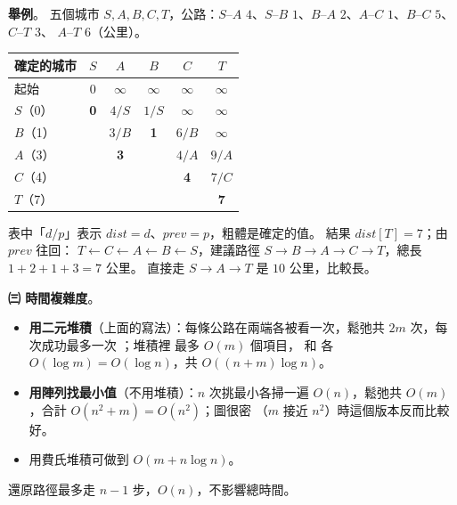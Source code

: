 \begin{pastsoln}
\textbf{舉例}。 五個城市 $S, A, B, C, T$，公路：$S$–$A$ $4$、$S$–$B$ $1$、$B$–$A$ $2$、$A$–$C$ $1$、$B$–$C$ $5$、$C$–$T$ $3$、
$A$–$T$ $6$（公里）。
\begin{center}
\end{center}
\begin{center}
\small
\begin{tabular}{lccccc}
\toprule
確定的城市 & $S$ & $A$ & $B$ & $C$ & $T$ \\
\midrule
起始 & $0$ & $\infty$ & $\infty$ & $\infty$ & $\infty$ \\
$S$（0） & \textbf{0} & $4/S$ & $1/S$ & $\infty$ & $\infty$ \\
$B$（1） & & $3/B$ & \textbf{1} & $6/B$ & $\infty$ \\
$A$（3） & & \textbf{3} & & $4/A$ & $9/A$ \\
$C$（4） & & & & \textbf{4} & $7/C$ \\
$T$（7） & & & & & \textbf{7} \\
\bottomrule
\end{tabular}
\end{center}
表中「$d/p$」表示 $\mathit{dist} = d$、$\mathit{prev} = p$，粗體是確定的值。 結果 $\mathit{dist}[T] = 7$；由 $\mathit{prev}$ 往回：
$T \leftarrow C \leftarrow A \leftarrow B \leftarrow S$，建議路徑 $S \to B \to A \to C \to T$，總長 $1 + 2 + 1 + 3 = 7$ 公里。 直接走
$S \to A \to T$ 是 $10$ 公里，比較長。

\textbf{㈢ 時間複雜度}。
\begin{itemize}
\item \textbf{用二元堆積}（上面的寫法）：每條公路在兩端各被看一次，鬆弛共 $2m$ 次，每次成功最多一次 ；堆積裡
最多 $O(m)$ 個項目， 和  各 $O(\log m) = O(\log n)$，共 $O((n + m) \log n)$。
\item \textbf{用陣列找最小值}（不用堆積）：$n$ 次挑最小各掃一遍 $O(n)$，鬆弛共 $O(m)$，合計 $O(n^2 + m) = O(n^2)$；圖很密
（$m$ 接近 $n^2$）時這個版本反而比較好。
\item 用費氏堆積可做到 $O(m + n \log n)$。
\end{itemize}
還原路徑最多走 $n - 1$ 步，$O(n)$，不影響總時間。
\end{pastsoln}
